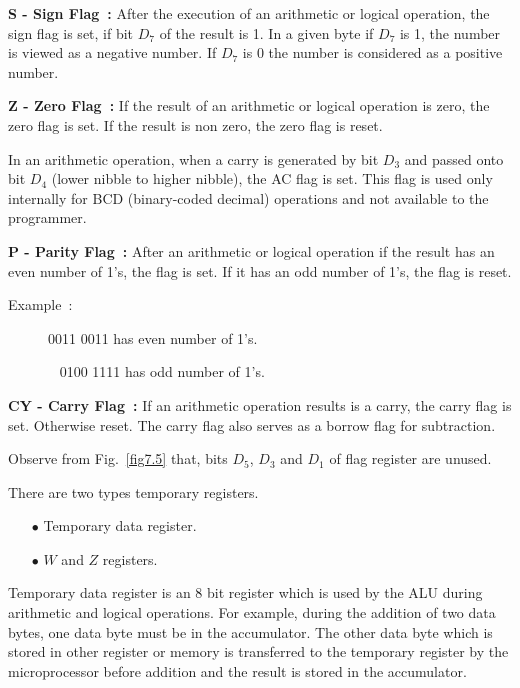 \noindent
{\bf S - Sign Flag~:} After the execution of an arithmetic or logical operation, the sign flag is set, if bit $D_{7}$ of the result is 1. In a given byte if $D_{7}$ is 1, the number is viewed as a negative number. If $D_{7}$ is $0$ the number is considered as a positive number.

\medskip
\noindent
{\bf Z - Zero Flag~:} If the result of an arithmetic or logical operation is zero, the zero flag is set. If the result is non zero, the zero flag is reset.

\eject

\medskip
{}

In an arithmetic operation, when a carry is generated by bit $D_{3}$ and passed onto bit $D_{4}$ (lower nibble to higher nibble), the AC flag is set. This flag is used only internally for BCD (binary-coded decimal) operations and not available to the programmer.

\medskip
\noindent
{\bf P - Parity Flag~:} After an arithmetic or logical operation if the result has an even number of 1's, the flag is set. If it has an odd number of 1's, the flag is reset.
\begin{description}
\item[Example~:] 0011 0011 has even number of 1's.

\qquad~ 0100 1111 has odd number of 1's.
\end{description}

\noindent
{\bf CY - Carry Flag~:} If an arithmetic operation results is a carry, the carry flag is set. Otherwise reset. The carry flag also serves as a borrow flag for subtraction.

Observe from Fig.~\ref{fig7.5} that, bits $D_{5}$, $D_{3}$ and $D_{1}$ of flag register are unused.

\medskip
{}

There are two types temporary registers.
\begin{itemize}
\item[$\bullet$] Temporary data register.

\item[$\bullet$] $W$ and $Z$ registers.
\end{itemize}

Temporary data register is an 8 bit register which is used by the ALU during arithmetic and logical operations. For example, during the addition of two data bytes, one data byte must be in the accumulator. The other data byte which is stored in other register or memory is transferred to the temporary register by the microprocessor before addition and the result is stored in the accumulator.

